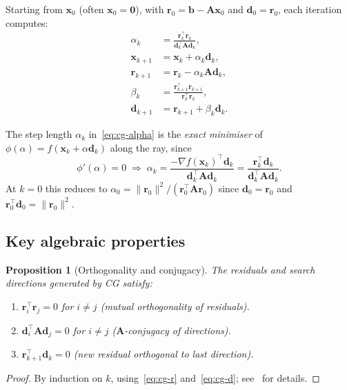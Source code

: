 \documentclass[11pt,a4paper]{article}
\newtheorem{proposition}[theorem]{Proposition}
\newcommand{\bA}{\mathbf{A}}
\newcommand{\bb}{\mathbf{b}}
\newcommand{\br}{\mathbf{r}}
\newcommand{\bd}{\mathbf{d}}
\newcommand{\bx}{\mathbf{x}}
\newcommand{\bzero}{\mathbf{0}}
\newcommand{\norm}[1]{\|#1\|}
\newcommand{\tr}{\top}
\begin{document}
Starting from $\bx_0$ (often $\bx_0 = \bzero$), with $\br_0 = \bb - \bA\bx_0$ and
$\bd_0 = \br_0$, each iteration computes:
\begin{align}
  \alpha_k   &= \frac{\br_k^\tr \br_k}{\bd_k^\tr \bA \bd_k},
              \label{eq:cg-alpha}\\[4pt]
  \bx_{k+1} &= \bx_k + \alpha_k \bd_k,
              \label{eq:cg-x}\\[4pt]
  \br_{k+1} &= \br_k - \alpha_k \bA \bd_k,
              \label{eq:cg-r}\\[4pt]
  \beta_k    &= \frac{\br_{k+1}^\tr \br_{k+1}}{\br_k^\tr \br_k},
              \label{eq:cg-beta-FR}\\[4pt]
  \bd_{k+1} &= \br_{k+1} + \beta_k \bd_k.
              \label{eq:cg-d}
\end{align}

The step length $\alpha_k$ in~\eqref{eq:cg-alpha} is the \emph{exact minimiser}
of $\phi(\alpha) = f(\bx_k + \alpha\bd_k)$ along the ray, since
\[
  \phi'(\alpha) = 0 \;\Longrightarrow\; \alpha_k
  = \frac{-\nabla f(\bx_k)^\tr \bd_k}{\bd_k^\tr \bA \bd_k}
  = \frac{\br_k^\tr \bd_k}{\bd_k^\tr \bA \bd_k}.
\]
At $k=0$ this reduces to $\alpha_0 = \norm{\br_0}^2 / (\br_0^\tr \bA \br_0)$
since $\bd_0 = \br_0$ and $\br_0^\tr\bd_0 = \norm{\br_0}^2$.

\subsection{Key algebraic properties}

\begin{proposition}[Orthogonality and conjugacy]
  \label{prop:orthogonality}
  The residuals and search directions generated by CG satisfy:
  \begin{enumerate}
    \item $\br_i^\tr \br_j = 0$ for $i \neq j$ (mutual orthogonality of residuals).
    \item $\bd_i^\tr \bA \bd_j = 0$ for $i \neq j$ ($\bA$-conjugacy of directions).
    \item $\br_{k+1}^\tr \bd_k = 0$ (new residual orthogonal to last direction).
  \end{enumerate}
\end{proposition}

\begin{proof}
  By induction on $k$, using~\eqref{eq:cg-r} and~\eqref{eq:cg-d}; see~\cite{NocWri2006} for details.
\end{proof}
\end{document}

